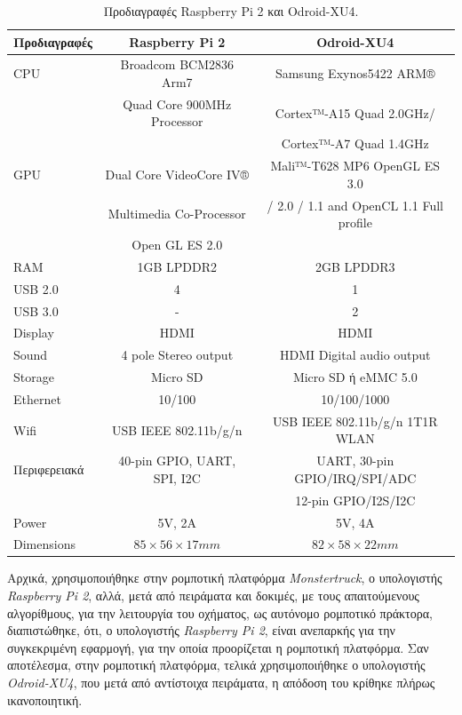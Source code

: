 \begin{table}[!ht]
	\caption{Προδιαγραφές Raspberry Pi 2 και Odroid-XU4.}
	\label{tab:computer_specs}
	\begin{center}
		\begin{tabular}{| l | c | c |}
	   		\hline
		   \textbf{Προδιαγραφές} & \textbf{Raspberry Pi 2} & \textbf{Odroid-XU4} \\ \hline
		   	CPU & Broadcom BCM2836 Arm7 & Samsung Exynos5422 ARM® \\ &Quad Core 900MHz Processor & Cortex™-A15 Quad 2.0GHz/\\ & & Cortex™-A7 Quad 1.4GHz\\ \hline
			GPU & Dual Core VideoCore IV® & Mali™-T628 MP6 OpenGL ES 3.0\\
			& Multimedia Co-Processor & / 2.0 / 1.1 and OpenCL 1.1 Full profile\\ 
			&  Open GL ES 2.0 &\\ \hline		   
		   RAM & 1GB LPDDR2 & 2GB LPDDR3 \\ \hline
		   USB 2.0 & 4 & 1\\ \hline
		   USB 3.0 & - & 2\\ \hline
		   Display & HDMI & HDMI\\ \hline
		   Sound & 4 pole Stereo output & HDMI Digital audio output\\ \hline
		   Storage & Micro SD & Micro SD ή eMMC 5.0\\ \hline
		   Ethernet & 10/100 & 10/100/1000\\ \hline
		  	Wifi & USB IEEE 802.11b/g/n & USB IEEE 802.11b/g/n 1T1R WLAN\\ \hline
		  	Περιφερειακά & 40-pin GPIO, UART, SPI, I2C & UART, 30-pin GPIO/IRQ/SPI/ADC\\
		  	& & 12-pin GPIO/I2S/I2C \\ \hline
		  	Power & 5V, 2A & 5V, 4A\\ \hline
		   Dimensions & $85 \times 56 \times 17 mm$ & $82 \times 58 \times 22 mm$\\\hline
	   \end{tabular}
	\end{center}
\end{table}

Αρχικά, χρησιμοποιήθηκε στην ρομποτική πλατφόρμα \textit{Monstertruck}, ο υπολογιστής \textit{Raspberry Pi 2}, αλλά, μετά από πειράματα και δοκιμές, με τους απαιτούμενους αλγορίθμους, για την λειτουργία του οχήματος, ως αυτόνομο ρομποτικό πράκτορα, διαπιστώθηκε, ότι, ο υπολογιστής \textit{Raspberry Pi 2},  είναι ανεπαρκής για την συγκεκριμένη εφαρμογή, για την οποία προορίζεται η ρομποτική πλατφόρμα. Σαν αποτέλεσμα, στην ρομποτική πλατφόρμα, τελικά χρησιμοποιήθηκε ο υπολογιστής \textit{Odroid-XU4}, που μετά από αντίστοιχα πειράματα, η απόδοση του κρίθηκε πλήρως ικανοποιητική.

